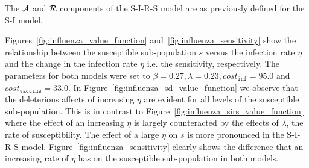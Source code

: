 The {\footnotesize $\mathcal{A}$} and {\footnotesize $\mathcal{R}$} components of the S-I-R-S model are as previously defined for the S-I model.

Figures~\ref{fig:influenza_value_function} and~\ref{fig:influenza_sensitivity} show the relationship between the susceptible sub-population {\footnotesize $s$} versus the infection rate {\footnotesize $\eta$} and the change in the infection rate {\footnotesize $\eta$} i.e. the sensitivity, respectively. The parameters for both models were set to {\footnotesize$ \beta = 0.27, \lambda = 0.23, cost_{\mathtt{inf}} = 95.0$} and {\footnotesize$cost_{\mathtt{vaccine}} = 33.0$}. In Figure~\ref{fig:influenza_sd_value_function} we observe that the deleterious affects of increasing {\footnotesize $\eta$} are evident for all levels of the susceptible sub-population. This is in contrast to Figure~\ref{fig:influenza_sirs_value_function} where the effect of an increasing {\footnotesize $\eta$} is largely counteracted by the effects of  {\footnotesize $ \lambda $}, the rate of susceptibility. The effect of a large {\footnotesize $\eta$} on {\footnotesize $s$} is more pronounced in the S-I-R-S model. Figure~\ref{fig:influenza_sensitivity} clearly shows the difference that an increasing rate of  {\footnotesize $\eta$} has on the susceptible sub-population in both models.




